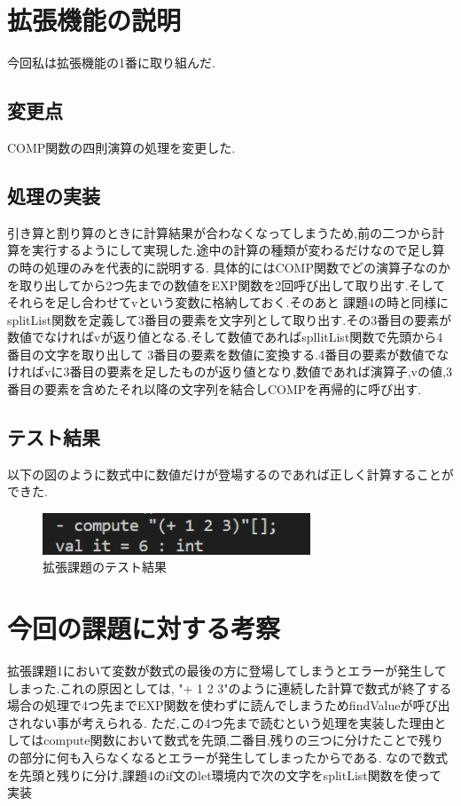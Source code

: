\documentclass[dvipdfmx]{jarticle}
\begin{document}
\section{拡張機能の説明}
今回私は拡張機能の1番に取り組んだ.
\subsection{変更点}
COMP関数の四則演算の処理を変更した.
\subsection{処理の実装}
引き算と割り算のときに計算結果が合わなくなってしまうため,前の二つから計算を実行するようにして実現した.途中の計算の種類が変わるだけなので足し算の時の処理のみを代表的に説明する.
具体的にはCOMP関数でどの演算子なのかを取り出してから2つ先までの数値をEXP関数を2回呼び出して取り出す.そしてそれらを足し合わせてvという変数に格納しておく.そのあと
課題4の時と同様にsplitList関数を定義して3番目の要素を文字列として取り出す.その3番目の要素が数値でなければvが返り値となる.そして数値であればspllitList関数で先頭から4番目の文字を取り出して
3番目の要素を数値に変換する.4番目の要素が数値でなければvに3番目の要素を足したものが返り値となり,数値であれば演算子,vの値,3番目の要素を含めたそれ以降の文字列を結合しCOMPを再帰的に呼び出す.
\subsection{テスト結果}
以下の図のように数式中に数値だけが登場するのであれば正しく計算することができた.
\begin{figure}[h]
    \centering
    \includegraphics[width=8cm]{kakutyou.png}
    \caption{拡張課題のテスト結果}
\end{figure}
\section{今回の課題に対する考察}
拡張課題1において変数が数式の最後の方に登場してしまうとエラーが発生してしまった.これの原因としては,
"+ 1 2 3"のように連続した計算で数式が終了する場合の処理で4つ先までEXP関数を使わずに読んでしまうためfindValueが呼び出されない事が考えられる.
ただ,この4つ先まで読むという処理を実装した理由としてはcompute関数において数式を先頭,二番目,残りの三つに分けたことで残りの部分に何も入らなくなるとエラーが発生してしまったからである.
なので数式を先頭と残りに分け,課題4のif文のlet環境内で次の文字をsplitList関数を使って実装
\end{document}
